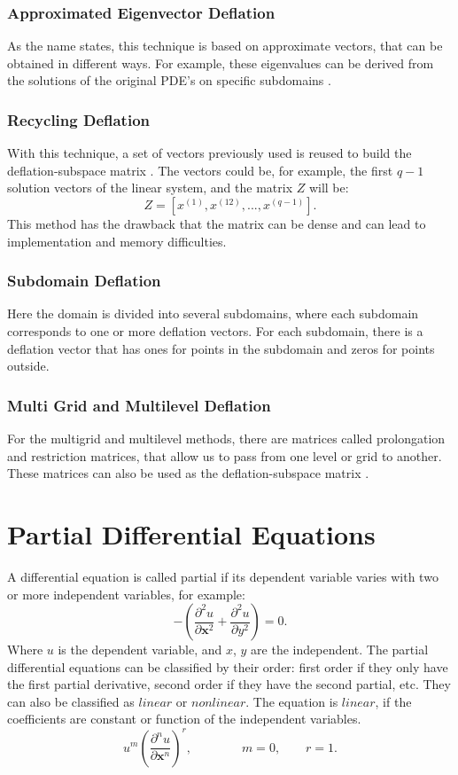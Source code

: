 \documentclass[12pt]{report}
\begin{document}
\subsection{Approximated Eigenvector Deflation}
As the name states, this technique is based on approximate vectors, that can be obtained in different ways. For example,
these eigenvalues can be derived from the solutions of the original PDE's on specific subdomains \cite{Vuik99}.

\subsection{Recycling Deflation}
With this technique, a set of vectors previously used is reused to build the deflation-subspace matrix \cite{Clemens04}. 
The vectors could be, for example, the first $q-1$
solution vectors of the linear system, and the matrix $Z$ will be:
$$Z=[x^{(1)},x^{(12)},...,x^{(q-1)}].$$
This method has the drawback that the matrix can be dense and can lead to implementation and memory difficulties. 

\subsection{Subdomain Deflation}
Here the domain is divided into several subdomains, where each subdomain corresponds to one or more deflation vectors.
For each subdomain, there is a deflation vector that has ones for points in the subdomain and zeros for points outside\cite{Vuik02}.

\subsection{Multi Grid and Multilevel Deflation}
For the multigrid and multilevel methods, there are matrices called prolongation and restriction matrices, that
allow us to pass from one level or grid to another. These matrices can also be used as the deflation-subspace matrix \cite{Smith96}.
\chapter{Partial Differential Equations}
A differential equation is called partial if its dependent variable varies with two or more independent variables,
for example:
\begin{equation*}
 -\left( \frac{\partial^2 u}{\partial\mathbf{x}^2}+\frac{\partial^2 u}{\partial y^2}\right) =0.
\end{equation*}
Where $u$ is the dependent variable, and $x$, $y$ are the independent. The partial differential equations can be classified by
their order: first order if they only have the first partial derivative, second order if they have the second partial, etc. They can also be
classified as $linear$ or $nonlinear$. The equation is $linear$, if the coefficients are constant or function of the independent variables.
$$u^m\left( \frac{\partial^n u}{\partial\mathbf{x}^n}\right)^r,\qquad \qquad m=0, \qquad r=1.$$
\end{document}
